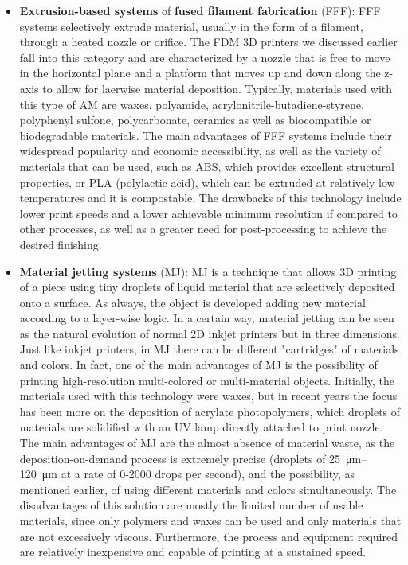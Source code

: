 \begin{itemize}
    \item \textbf{Extrusion-based systems} of \textbf{fused filament fabrication} (FFF): FFF systems selectively extrude material, usually in the form of a filament, through a heated nozzle or orifice. The FDM 3D printers we discussed earlier fall into this category and are characterized by a nozzle that is free to move in the horizontal plane and a platform that moves up and down along the z-axis to allow for laerwise material deposition. Typically, materials used with this type of AM are waxes, polyamide, acrylonitrile-butadiene-styrene, polyphenyl sulfone, polycarbonate, ceramics as well as biocompatible or biodegradable materials. The main advantages of FFF systems include their widespread popularity and economic accessibility, as well as the variety of materials that can be used, such as ABS, which provides excellent structural properties, or PLA (polylactic acid), which can be extruded at relatively low temperatures and it is compostable. The drawbacks of this technology include lower print speeds and a lower achievable minimum resolution if compared to other processes, as well as a greater need for post-processing to achieve the desired finishing.
    \item \textbf{Material jetting systems} (MJ): MJ is a technique that allows 3D printing of a piece using tiny droplets of liquid material that are selectively deposited onto a surface. As always, the object is developed adding new material according to a layer-wise logic. In a certain way, material jetting can be seen as the natural evolution of normal 2D inkjet printers but in three dimensions. Just like inkjet printers, in MJ there can be different "cartridges" of materials and colors. In fact, one of the main advantages of MJ is the possibility of printing high-resolution multi-colored or multi-material objects. Initially, the materials used with this technology were waxes, but in recent years the focus has been more on the deposition of acrylate photopolymers, which droplets of materials are solidified with an UV lamp directly attached to print nozzle. The main advantages of MJ are the almost absence of material waste, as the deposition-on-demand process is extremely precise (droplets of \SIrange{25}{120}{\micro\meter} at a rate of 0-2000 drops per second), and the possibility, as mentioned earlier, of using different materials and colors simultaneously. The disadvantages of this solution are mostly the limited number of usable materials, since only polymers and waxes can be used and only materials that are not excessively viscous. Furthermore, the process and equipment required are relatively inexpensive and capable of printing at a sustained speed.

\end{itemize}
